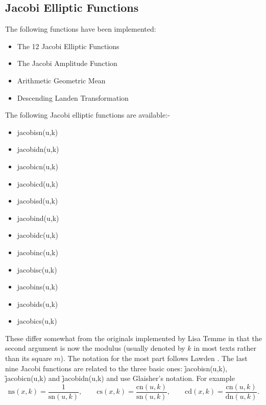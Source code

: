 \hypertarget{JACEF}{}
\subsection{Jacobi Elliptic  Functions}
The following functions have been implemented:
\begin{itemize}
\item The 12 Jacobi Elliptic Functions
\item The Jacobi Amplitude Function
\item Arithmetic Geometric Mean
\item Descending Landen Transformation
\end{itemize}

The following Jacobi elliptic functions are available:-
\hypertarget{operator:JACOBISN}{}
\hypertarget{operator:JACOBICN}{}
\hypertarget{operator:JACOBIDN}{}
\hypertarget{operator:JACOBISD}{}
\hypertarget{operator:JACOBIND}{}
\hypertarget{operator:JACOBIDC}{}
\hypertarget{operator:JACOBINC}{}
\hypertarget{operator:jACOBISC}{}
\hypertarget{operator:JACOBINS}{}
\hypertarget{operator:JACOBIDS}{}
\hypertarget{operator:JACOBICS}{}
\begin{itemize}
\item jacobisn(u,k)
\item jacobidn(u,k)
\item jacobicn(u,k)
\item jacobicd(u,k)
\item jacobisd(u,k)
\item jacobind(u,k)
\item jacobidc(u,k)
\item jacobinc(u,k)
\item jacobisc(u,k)
\item jacobins(u,k)
\item jacobids(u,k)
\item jacobics(u,k)
\end{itemize}

These differ somewhat from the originals implemented by Lisa Temme in that
the second argument is now the modulus (usually denoted by $k$ in most texts
rather than its square $m$).  The notation for the most part follows  Lawden
\cite{Lawden:89}. The last nine Jacobi functions are related to the three
basic ones: \f{jacobisn(u,k)}, \f{jacobicn(u,k)} and \f{jacobidn(u,k)} and
use Glaisher's notation. For example
\[ \mathrm{ns}(x,k) = \frac{1}{\mathrm{sn}(u,k)}, \qquad
\mathrm{cs}(x,k) = \frac{\mathrm{cn}(u,k)}{\mathrm{sn}(u,k)}, \qquad
\mathrm{cd}(x,k) = \frac{\mathrm{cn}(u,k)}{\mathrm{dn}(u,k)}. \]

